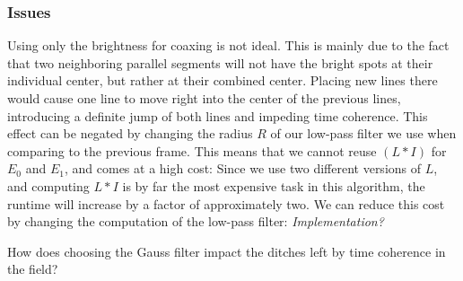 \subsubsection*{Issues}
Using only the brightness for coaxing is not ideal.
This is mainly due to the fact that two neighboring parallel segments will not have the bright spots at their individual center,
but rather at their combined center.
Placing new lines there would cause one line to move right into the center of the previous lines,
introducing a definite jump of both lines and impeding time coherence.
This effect can be negated by changing the radius $R$ of our low-pass filter we use
when comparing to the previous frame.
This means that we cannot reuse $(L\ast I)$ for $E_0$ and $E_1$, and comes at a high cost:
Since we use two different versions of $L$, and computing $L\ast I$ is by far the most expensive task in this algorithm,
the runtime will increase by a factor of approximately two.
We can reduce this cost by changing the computation of the low-pass filter:
\textit{Implementation?}

\begin{minipage}{.5\textwidth}
    How does choosing the Gauss filter impact the ditches left by time coherence in the field? 
\end{minipage}
\begin{minipage}{.5\textwidth}
    
\end{minipage}


